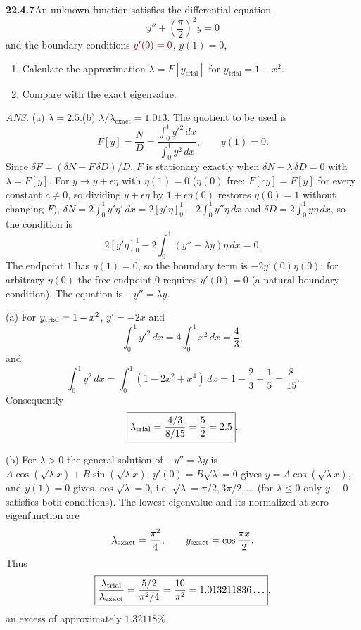 \par\bigskip
\noindent\textbf{22.4.7}\quad An unknown function satisfies the
differential equation
\[
y''+\left(\frac{\pi}{2}\right)^{2}y=0
\]
and the boundary conditions $\erratum{y'(0)=0}$, $y(1)=0$,
\begin{enumerate}
\item[(a)] Calculate the approximation $\lambda=F[y_{\text{trial}}]$
for $y_{\text{trial}}=1-x^{2}$.
\item[(b)] Compare with the exact eigenvalue.
\end{enumerate}
\par\nobreak\hfill\emph{ANS.}\enspace
(a) $\lambda=2.5$.\quad(b) $\lambda/\lambda_{\text{exact}}=1.013$.
\solution
{}
The quotient to be used is
\[
 F[y]=\frac{N}{D}=\frac{\int_0^1y'^2\,dx}{\int_0^1y^2\,dx},\qquad y(1)=0.
\]
Since $\delta F=(\delta N-F\,\delta D)/D$, $F$ is stationary exactly
when $\delta N-\lambda\,\delta D=0$ with $\lambda=F[y]$. For
$y\to y+\epsilon\eta$ with $\eta(1)=0$ ($\eta(0)$ free: $F[cy]=F[y]$ for
every constant $c\ne0$, so dividing $y+\epsilon\eta$ by
$1+\epsilon\eta(0)$ restores $y(0)=1$ without changing $F$), $\delta N=2\int_0^1y'\eta'\,dx
=2[y'\eta]_0^1-2\int_0^1y''\eta\,dx$ and $\delta D=2\int_0^1y\eta\,dx$,
so the condition is
\[
 2[y'\eta]_0^1-2\int_0^1(y''+\lambda y)\eta\,dx=0.
\]
The endpoint $1$ has $\eta(1)=0$, so the boundary term is
$-2y'(0)\eta(0)$; for arbitrary $\eta(0)$ the free endpoint $0$
requires $y'(0)=0$ (a natural boundary condition).  The equation is
$-y''=\lambda y$.

(a) For $y_{\rm trial}=1-x^2$, $y'=-2x$ and
\[
 \int_0^1y'^2\,dx=4\int_0^1x^2\,dx=\frac43,
\]
and
\[
 \int_0^1y^2\,dx
 =\int_0^1(1-2x^2+x^4)\,dx
 =1-\frac23+\frac15=\frac8{15}.
\]
Consequently
\[
 \boxed{\lambda_{\rm trial}=\frac{4/3}{8/15}=\frac52=2.5}.
\]

(b) For $\lambda>0$ the general solution of $-y''=\lambda y$ is
$A\cos(\sqrt\lambda x)+B\sin(\sqrt\lambda x)$; $y'(0)=B\sqrt\lambda=0$
gives $y=A\cos(\sqrt\lambda x)$, and $y(1)=0$ gives
$\cos\sqrt\lambda=0$, i.e. $\sqrt\lambda=\pi/2,3\pi/2,\ldots$
(for $\lambda\le0$ only $y\equiv0$ satisfies both conditions).
The lowest eigenvalue and its normalized-at-zero
eigenfunction are
\[
 \lambda_{\rm exact}=\frac{\pi^2}{4},\qquad
 y_{\rm exact}=\cos\frac{\pi x}{2}.
\]
Thus
\[
 \boxed{\frac{\lambda_{\rm trial}}{\lambda_{\rm exact}}
       =\frac{5/2}{\pi^2/4}=\frac{10}{\pi^2}=1.013211836\ldots},
\]
an excess of approximately $1.32118\%$.



